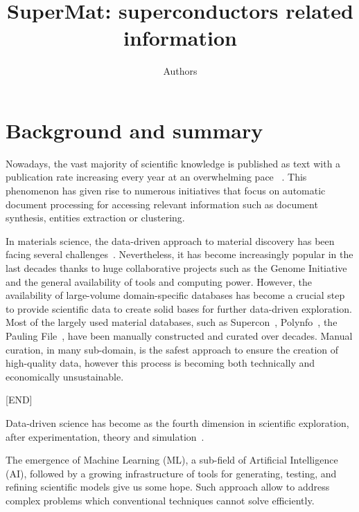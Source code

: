 \documentclass[a4paper,10pt]{article}
\title{SuperMat: superconductors related information}
\author{Authors}
\begin{document}
\maketitle

\section{Background and summary}
Nowadays, the vast majority of scientific knowledge is published as text with a publication rate increasing every year at an overwhelming pace~\cite{Youtie2008NanotechnologyPA} \cite{Grigas2017JustGI} \cite{Khabsa2014TheNO} \cite{OrduaMalea2015MethodsFE} \cite{Bjrk2009ScientificJP}.
This phenomenon has given rise to numerous initiatives that focus on automatic document processing for accessing relevant information such as document synthesis, entities extraction or clustering. 

In materials science, the data-driven approach to material discovery has been facing several challenges~\cite{Hill2016MaterialsSW}. 
Nevertheless, it has become increasingly popular in the last decades thanks to huge collaborative projects such as the Genome Initiative~\cite{material_genome_initiative} \cite{Jain2013CommentaryTM_materialsProject} and the general availability of tools and computing power. 
However, the availability of large-volume domain-specific databases has become a crucial step to provide scientific data to create solid bases for further data-driven exploration. 
Most of the largely used material databases, such as Supercon~\cite{SuperCon}, Polynfo~\cite{polynfo}, the Pauling File~\cite{Blokhin2018ThePF_paulingFile}, have been manually constructed and curated over decades. Manual curation, in many sub-domain, is the safest approach to ensure the creation of high-quality data, however this process is becoming both technically and economically unsustainable. 

[END]

Data-driven science has become as the fourth dimension in scientific exploration, after experimentation, theory and simulation~\cite{doi:10.1063/1.4944682}.


The emergence of Machine Learning (ML), a sub-field of Artificial Intelligence (AI), followed by a growing infrastructure of tools for generating, testing, and refining scientific models give us some hope. Such approach allow to address complex problems which conventional techniques cannot solve efficiently. 
\end{document}
